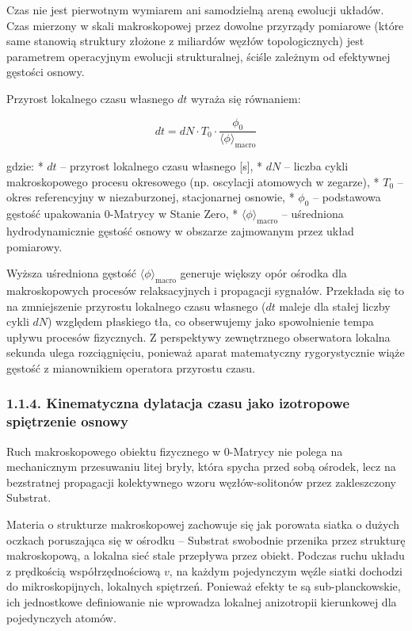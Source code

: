 \documentclass[
  letterpaper,
  DIV=11,
  numbers=noendperiod]{scrartcl}
\numberwithin{equation}{subsection}
\begin{document}
Czas nie jest pierwotnym wymiarem ani samodzielną areną ewolucji
układów. Czas mierzony w skali makroskopowej przez dowolne przyrządy
pomiarowe (które same stanowią struktury złożone z miliardów węzłów
topologicznych) jest parametrem operacyjnym ewolucji strukturalnej,
ściśle zależnym od efektywnej gęstości osnowy.

Przyrost lokalnego czasu własnego \(dt\) wyraża się równaniem:

\[dt = dN \cdot T_0 \cdot \frac{\phi_0}{\langle\phi\rangle_{\text{macro}}} \tag{1.1.2}\]

gdzie: * \(dt\) -- przyrost lokalnego czasu własnego {[}s{]}, * \(dN\)
-- liczba cykli makroskopowego procesu okresowego (np. oscylacji
atomowych w zegarze), * \(T_0\) -- okres referencyjny w niezaburzonej,
stacjonarnej osnowie, * \(\phi_0\) -- podstawowa gęstość upakowania
0-Matrycy w Stanie Zero, * \(\langle\phi\rangle_{\text{macro}}\) --
uśredniona hydrodynamicznie gęstość osnowy w obszarze zajmowanym przez
układ pomiarowy.

Wyższa uśredniona gęstość \(\langle\phi\rangle_{\text{macro}}\) generuje
większy opór ośrodka dla makroskopowych procesów relaksacyjnych i
propagacji sygnałów. Przekłada się to na zmniejszenie przyrostu
lokalnego czasu własnego (\(dt\) maleje dla stałej liczby cykli \(dN\))
względem płaskiego tła, co obserwujemy jako spowolnienie tempa upływu
procesów fizycznych. Z perspektywy zewnętrznego obserwatora lokalna
sekunda ulega rozciągnięciu, ponieważ aparat matematyczny rygorystycznie
wiąże gęstość z mianownikiem operatora przyrostu czasu.

\subsubsection{1.1.4. Kinematyczna dylatacja czasu jako izotropowe
spiętrzenie
osnowy}\label{kinematyczna-dylatacja-czasu-jako-izotropowe-spiux119trzenie-osnowy}

Ruch makroskopowego obiektu fizycznego w 0-Matrycy nie polega na
mechanicznym przesuwaniu litej bryły, która spycha przed sobą ośrodek,
lecz na bezstratnej propagacji kolektywnego wzoru węzłów-solitonów przez
zakleszczony Substrat.

Materia o strukturze makroskopowej zachowuje się jak porowata siatka o
dużych oczkach poruszająca się w ośrodku -- Substrat swobodnie przenika
przez strukturę makroskopową, a lokalna sieć stale przepływa przez
obiekt. Podczas ruchu układu z prędkością współrzędnościową \(v\), na
każdym pojedynczym węźle siatki dochodzi do mikroskopijnych, lokalnych
spiętrzeń. Ponieważ efekty te są sub-planckowskie, ich jednostkowe
definiowanie nie wprowadza lokalnej anizotropii kierunkowej dla
pojedynczych atomów.
\end{document}

